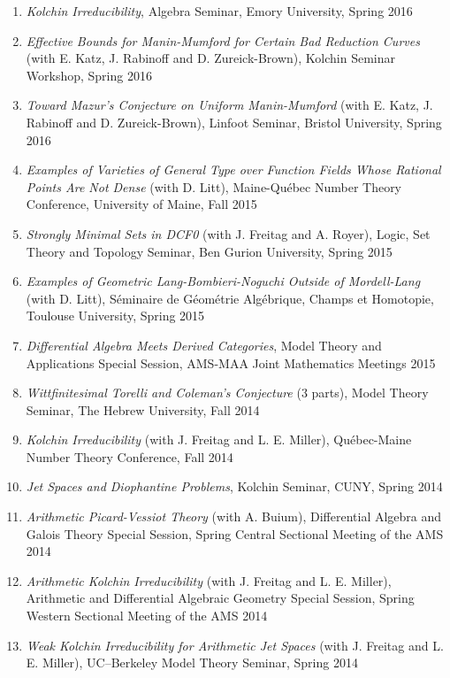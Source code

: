 \documentclass[a4paper,10pt]{article}
\begin{document}
\begin{enumerate}
	\item \emph{Kolchin Irreducibility}, Algebra Seminar, Emory University, Spring 2016 
	\item \emph{Effective Bounds for Manin-Mumford for Certain Bad Reduction Curves} (with E. Katz, J. Rabinoff and D. Zureick-Brown), Kolchin Seminar Workshop, Spring 2016
	\item \emph{Toward Mazur's Conjecture on Uniform Manin-Mumford} (with E. Katz, J. Rabinoff and D. Zureick-Brown), Linfoot Seminar, Bristol University, Spring 2016
	\item \emph{Examples of Varieties of General Type over Function Fields Whose Rational Points Are Not Dense} (with D. Litt),  Maine-Québec Number Theory Conference, University of Maine, Fall 2015
	\item \emph{Strongly Minimal Sets in DCF0} (with J. Freitag and A. Royer), Logic, Set Theory and Topology Seminar, Ben Gurion University, Spring 2015
	\item \emph{Examples of Geometric Lang-Bombieri-Noguchi Outside of Mordell-Lang} (with D. Litt), S\'eminaire de G\'eom\'etrie Alg\'ebrique, Champs et Homotopie, Toulouse University, Spring 2015
	\item \emph{Differential Algebra Meets Derived Categories}, Model Theory and Applications Special Session, AMS-MAA Joint Mathematics Meetings 2015
	\item \emph{Wittfinitesimal Torelli and Coleman's Conjecture} (3 parts), Model Theory Seminar, The Hebrew University, Fall 2014
	\item \emph{Kolchin Irreducibility} (with J. Freitag and L. E. Miller),
	Qu\'{e}bec-Maine Number Theory Conference, Fall 2014
	\item \emph{Jet Spaces and Diophantine Problems},
	Kolchin Seminar, CUNY, Spring 2014
	\item \emph{Arithmetic Picard-Vessiot Theory} (with A. Buium),
	Differential Algebra and Galois Theory Special Session, Spring Central Sectional Meeting of the AMS 2014
	\item \emph{Arithmetic Kolchin Irreducibility} (with J. Freitag and L. E. Miller), 
	Arithmetic and Differential Algebraic Geometry Special Session, Spring Western Sectional Meeting of the AMS 2014
	\item \emph{Weak Kolchin Irreducibility for Arithmetic Jet Spaces} (with J. Freitag and L. E. Miller), UC--Berkeley Model Theory Seminar, Spring 2014

\end{enumerate}
\end{document}
